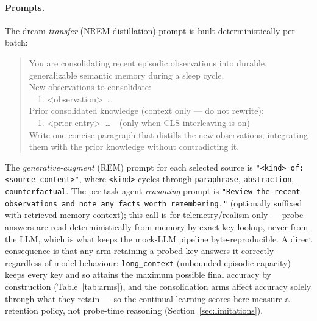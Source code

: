 \paragraph{Prompts.} The dream \emph{transfer} (NREM distillation) prompt is
built deterministically per batch:
\begin{quote}\small\ttfamily
You are consolidating recent episodic observations into durable, generalizable
semantic memory during a sleep cycle.\\[2pt]
New observations to consolidate:\\
\ \ 1. <observation>\ \ldots\\[2pt]
Prior consolidated knowledge (context only --- do not rewrite):\\
\ \ 1. <prior entry>\ \ldots\ \ (only when CLS interleaving is on)\\[2pt]
Write one concise paragraph that distills the new observations, integrating them
with the prior knowledge without contradicting it.
\end{quote}
The \emph{generative-augment} (REM) prompt for each selected source is
\texttt{"<kind> of: <source content>"}, where \texttt{<kind>} cycles through
\texttt{paraphrase}, \texttt{abstraction}, \texttt{counterfactual}. The per-task
agent \emph{reasoning} prompt is \texttt{"Review the recent observations and note
any facts worth remembering."} (optionally suffixed with retrieved memory
context); this call is for telemetry/realism only --- probe answers are read
deterministically from memory by exact-key lookup, never from the LLM, which is
what keeps the mock-LLM pipeline byte-reproducible. A direct consequence is that
any arm retaining a probed key answers it correctly regardless of model behaviour:
\texttt{long\_context} (unbounded episodic capacity) keeps every key and so attains
the maximum possible final accuracy by construction (Table~\ref{tab:arms}), and the
consolidation arms affect accuracy solely through what they retain --- so the
continual-learning scores here measure a retention policy, not probe-time reasoning
(Section~\ref{sec:limitations}).
